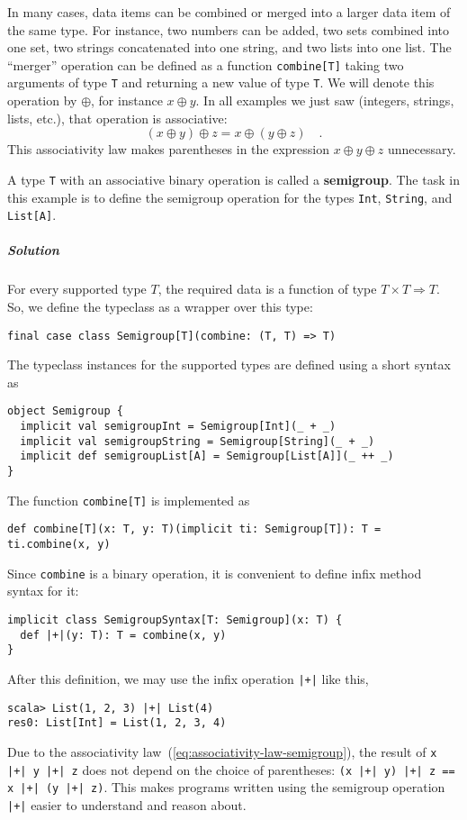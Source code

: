 In many cases, data items can be combined or merged into a larger
data item of the same type. For instance, two numbers can be added,
two sets combined into one set, two strings concatenated into one
string, and two lists into one list. The ``merger'' operation can
be defined as a function \lstinline!combine[T]! taking two arguments
of type \lstinline!T! and returning a new value of type \lstinline!T!.
We will denote this operation by $\oplus$, for instance $x\oplus y$.
In all examples we just saw (integers, strings, lists, etc.), that
operation is associative:
\begin{equation}
\left(x\oplus y\right)\oplus z=x\oplus\left(y\oplus z\right)\quad.\label{eq:associativity-law-semigroup}
\end{equation}
This associativity law makes parentheses
in the expression $x\oplus y\oplus z$ unnecessary.

A type \lstinline!T! with an associative binary operation is called
a \textbf{semigroup}. The task in this example is
to define the semigroup operation for the types \lstinline!Int!,
\lstinline!String!, and \lstinline!List[A]!.

\subparagraph{Solution}

For every supported type $T$, the required data is a function of
type $T\times T\Rightarrow T$. So, we define the typeclass as a wrapper
over this type:
\begin{lstlisting}
final case class Semigroup[T](combine: (T, T) => T)
\end{lstlisting}
The typeclass instances for the supported types are defined using
a short syntax as
\begin{lstlisting}
object Semigroup {
  implicit val semigroupInt = Semigroup[Int](_ + _)
  implicit val semigroupString = Semigroup[String](_ + _)
  implicit def semigroupList[A] = Semigroup[List[A]](_ ++ _)
}
\end{lstlisting}
The function \lstinline!combine[T]! is implemented as
\begin{lstlisting}
def combine[T](x: T, y: T)(implicit ti: Semigroup[T]): T = ti.combine(x, y)
\end{lstlisting}
Since \lstinline!combine! is a binary operation, it is convenient
to define infix method syntax for it:
\begin{lstlisting}
implicit class SemigroupSyntax[T: Semigroup](x: T) {
  def |+|(y: T): T = combine(x, y)
}
\end{lstlisting}
After this definition, we may use the infix operation \lstinline!|+|!
like this,
\begin{lstlisting}
scala> List(1, 2, 3) |+| List(4)
res0: List[Int] = List(1, 2, 3, 4)
\end{lstlisting}
Due to the associativity law~(\ref{eq:associativity-law-semigroup}),
the result of \lstinline!x |+| y |+| z! does not depend on the choice
of parentheses: \lstinline!(x |+| y) |+| z == x |+| (y |+| z)!. This
makes programs written using the semigroup operation \lstinline!|+|!
easier to understand and reason about.

